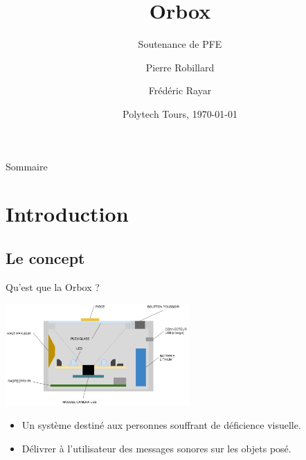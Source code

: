 \documentclass{beamer}
\title{Orbox}
\subtitle{Soutenance de PFE}
\author{Pierre Robillard\inst{1} \and Frédéric Rayar\inst{2}}
\institute[Universities of Somewhere and Elsewhere] %
{
  \inst{1}%
  Réalisation\\
  Étudiants DII 5A
  \and
  \inst{2}%
  Encadrant du projet\\
  PhD Candidate}
\date{Polytech Tours, \today}
\begin{document}
\begin{frame}
  \titlepage
\end{frame}

\begin{frame}{Sommaire}
  \tableofcontents
\end{frame}

\section{Introduction}

\subsection{Le concept}

\begin{frame}{Qu'est que la Orbox ?}

\begin{center}
    \includegraphics[width=7cm]{InitialSketch}
\end{center}

\begin{itemize}
    \item Un système destiné aux personnes souffrant de déficience visuelle.
    \item Délivrer à l’utilisateur des messages sonores sur les objets posé.

\end{itemize}

\end{frame}
\end{document}
